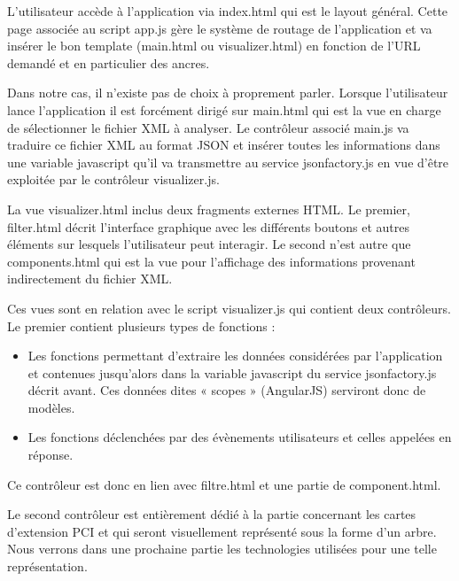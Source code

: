 \documentclass [a4paper,11pt]{article}
\begin{document}
L’utilisateur accède à l’application via index.html qui est le layout général. Cette page associée au script app.js gère le système de routage de l’application et va insérer le bon template (main.html ou visualizer.html) en fonction de l’URL demandé et en particulier des ancres.
\newline

Dans notre cas, il n’existe pas de choix à proprement parler. Lorsque l’utilisateur lance l’application il est forcément dirigé sur main.html qui est la vue en charge de sélectionner le fichier XML à analyser. Le contrôleur associé main.js va traduire ce fichier XML au format JSON et insérer toutes les informations dans une variable javascript qu’il va transmettre au service jsonfactory.js en vue d’être exploitée par le contrôleur visualizer.js.
\newline

La vue visualizer.html inclus deux fragments externes HTML. Le premier, filter.html décrit l’interface graphique avec les différents boutons et autres éléments sur lesquels l’utilisateur peut interagir. Le second n’est autre que components.html qui est la vue pour l’affichage des informations provenant indirectement du fichier XML.
\newline

Ces vues sont en relation avec le script visualizer.js qui contient deux contrôleurs. Le premier contient plusieurs types de fonctions :
\newline

\begin{itemize}
 \item Les fonctions permettant d’extraire les données considérées par l’application et contenues jusqu’alors dans la variable javascript du service jsonfactory.js décrit avant. Ces données dites « scopes » (AngularJS) serviront donc de modèles.
 \item Les fonctions déclenchées par des évènements utilisateurs et celles appelées en réponse.
 \newline
\end{itemize}
\newline

Ce contrôleur est donc en lien avec filtre.html et une partie de component.html.
\newline

Le second contrôleur est entièrement dédié à la partie concernant les cartes d’extension PCI et qui seront visuellement représenté sous la forme d’un arbre. Nous verrons dans une prochaine partie les technologies utilisées pour une telle représentation.
\newline
\end{document}
